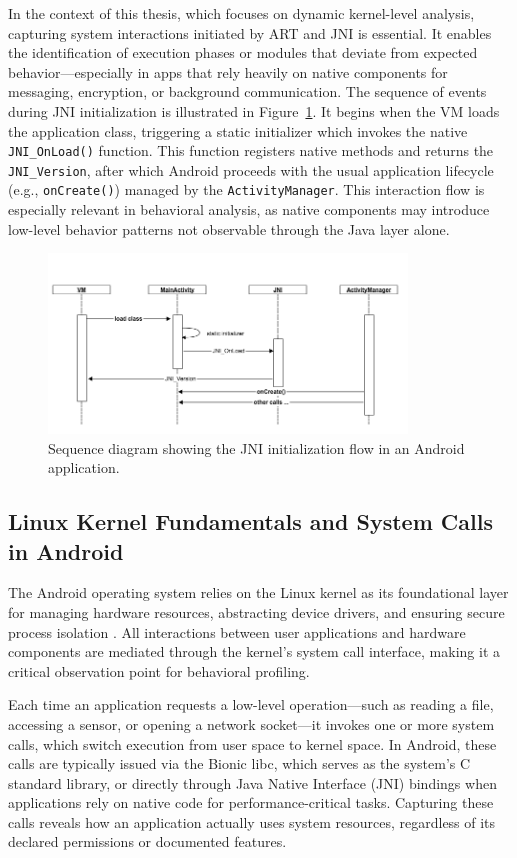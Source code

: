 \documentclass[a4paper,12pt]{report}
\begin{document}
In the context of this thesis, which focuses on dynamic kernel-level analysis, capturing system interactions initiated by ART and JNI is essential. It enables the identification of execution phases or modules that deviate from expected behavior—especially in apps that rely heavily on native components for messaging, encryption, or background communication. The sequence of events during JNI initialization is illustrated in Figure~\ref{fig:jni_init}. It begins when the VM loads the application class, triggering a static initializer which invokes the native \texttt{JNI\_OnLoad()} function. This function registers native methods and returns the \texttt{JNI\_Version}, after which Android proceeds with the usual application lifecycle (e.g., \texttt{onCreate()}) managed by the \texttt{ActivityManager}. This interaction flow is especially relevant in behavioral analysis, as native components may introduce low-level behavior patterns not observable through the Java layer alone.

\begin{figure}[H]
    \centering
    \includegraphics[width=0.85\textwidth]{jni_init_flow.png}
    \caption{Sequence diagram showing the JNI initialization flow in an Android application.}
    \label{fig:jni_init}
\end{figure}

\subsection{Linux Kernel Fundamentals and System Calls in Android}
The Android operating system relies on the Linux kernel as its foundational layer for managing hardware resources, abstracting device drivers, and ensuring secure process isolation \cite{love2010linux}. All interactions between user applications and hardware components are mediated through the kernel’s system call interface, making it a critical observation point for behavioral profiling.

Each time an application requests a low-level operation—such as reading a file, accessing a sensor, or opening a network socket—it invokes one or more system calls, which switch execution from user space to kernel space. In Android, these calls are typically issued via the Bionic libc, which serves as the system’s C standard library, or directly through Java Native Interface (JNI) bindings when applications rely on native code for performance-critical tasks. Capturing these calls reveals how an application actually uses system resources, regardless of its declared permissions or documented features.
\end{document}
